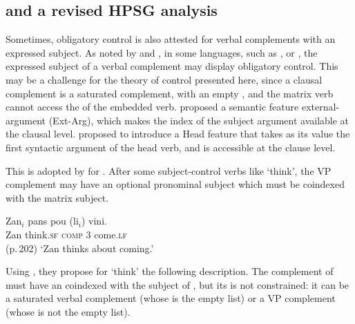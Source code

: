 \documentclass[output=paper
	        ,collection
	        ,collectionchapter
 	        ,biblatex
                ,babelshorthands
                ,newtxmath
                ,draftmode
                ,colorlinks, citecolor=brown
]{langscibook}
\begin{document}


\subsection{\xarg and a revised HPSG analysis}\label{section-xarg}

Sometimes, obligatory control is also attested for verbal complements with an expressed subject. 
As noted by \citet{Zec87a-u,Farkas1988} and \citet[--116]{GH2001a-u}, in some languages,  such as ,   \citep{Kuno76a-u,Iida96a-u} or  \citep{Karimi2008},  the expressed subject of a verbal complement
may display obligatory control. This may be a challenge for the theory of control presented here, since a clausal complement is a
saturated complement, with an empty \subjl, and the matrix verb cannot access the \subjv of the
embedded verb. \citet[]{SP91a-u} proposed a semantic feature external-argument (Ext-Arg), which makes the index of the subject argument available at the clausal level.  \citet{Sag2007a} proposed to introduce a Head
feature \xarg that takes as its value the first syntactic argument of the head verb, and is
accessible at the clause level. 

This is adopted by \citet{HenriandLaurens2011} for .  After some subject-control verbs
like  `think', the VP complement may have an optional pronominal subject which must be coindexed with the matrix subject. 

\begin{exe}
\ex \gll Zan$_{i}$ pans pou (li$_{i}$) vini.\\
Zan think.\textsc{sf} \textsc{comp} 3\SG{} come.\textsc{lf}  \\\hfill(p.\,202)
 \glt `Zan thinks about coming.'
\end{exe}

Using \xarg, they propose for  `think' 
the following description. The complement of  must have an \xarg coindexed with the subject of , but its \subjl is not constrained: it can be a saturated verbal complement (whose \subjv is the empty list) or a VP complement (whose \subjv is not the empty list).
\end{document}
